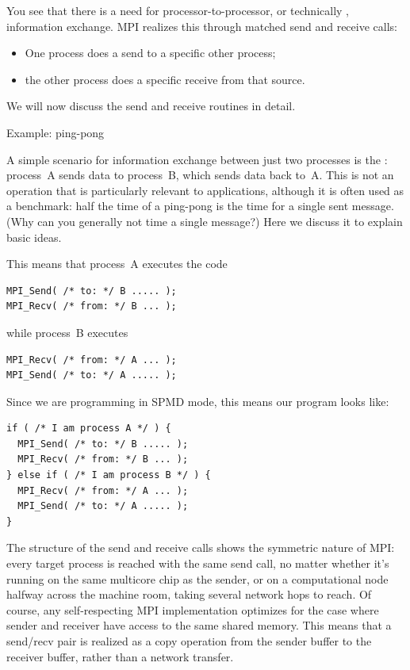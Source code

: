 You see that there is a need for processor-to-processor, or
technically , information exchange.
MPI realizes this through matched send and receive calls:
\begin{itemize}
\item One process does a send to a specific other process;
\item the other process does a specific receive from that source.
\end{itemize}

We will now discuss the send and receive routines in detail.

 {Example: ping-pong}
\label{sec:mpi-send-recv}

A simple scenario for information exchange between just two processes
is the : process~A sends data to process~B, which
sends data back to~A.
This is not an operation that is particularly relevant to applications,
although it is often used as a benchmark:
half the time of a ping-pong is the time for a single sent message.
(Why can you generally not time a single message?)
Here we discuss it to explain basic ideas.

This means that process~A executes the code
\begin{lstlisting}
MPI_Send( /* to: */ B ..... );
MPI_Recv( /* from: */ B ... );
\end{lstlisting}
while process~B executes
\begin{lstlisting}
MPI_Recv( /* from: */ A ... );
MPI_Send( /* to: */ A ..... );
\end{lstlisting}
Since we are programming in SPMD mode, this means our program looks like:
\begin{lstlisting}
if ( /* I am process A */ ) {
  MPI_Send( /* to: */ B ..... );
  MPI_Recv( /* from: */ B ... );
} else if ( /* I am process B */ ) {
  MPI_Recv( /* from: */ A ... );
  MPI_Send( /* to: */ A ..... );
}
\end{lstlisting}


\begin{remark}
  The structure of the send and receive calls shows the symmetric nature of MPI: every
  target process is reached with the same send call, no matter whether it's
  running on the same multicore chip as the sender, or on a
  computational node halfway across the machine room, taking
  several network hops to reach. Of course, any
  self-respecting MPI implementation optimizes for the case where sender
  and receiver have access to the same shared memory.
  This means that a send/recv pair is realized as
  a copy operation from the sender buffer to the
  receiver buffer, rather than a network transfer.
\end{remark}

